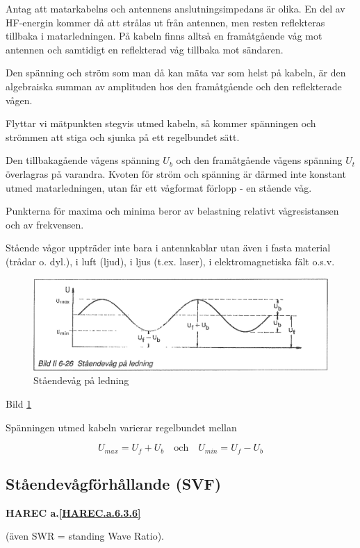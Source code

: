 Antag att matarkabelns och antennens anslutningsimpedans är olika. En
del av HF-energin kommer då att strålas ut från antennen, men resten
reflekteras tillbaka i matarledningen. På kabeln finns alltså en
framåtgående våg mot antennen och samtidigt en reflekterad våg
tillbaka mot sändaren.

Den spänning och ström som man då kan mäta var som helst på kabeln, är
den algebraiska summan av amplituden hos den framåtgående och den
reflekterade vågen.

Flyttar vi mätpunkten stegvis utmed kabeln, så kommer spänningen och
strömmen att stiga och sjunka på ett regelbundet sätt.

Den tillbakagående vågens spänning \(U_b\) och den framåtgående vågens
spänning \(U_t\) överlagras på varandra. Kvoten för ström och spänning
är därmed inte konstant utmed matarledningen, utan får ett vågformat
förlopp - en stående våg.

Punkterna för maxima och minima beror av belastning relativt
vågresistansen och av frekvensen.

Stående vågor uppträder inte bara i antennkablar utan även i fasta
material (trådar o. dyl.), i luft (ljud), i ljus (t.ex. laser), i
elektromagnetiska fält o.s.v.

\begin{figure}
  \includegraphics[width=\textwidth]{images/bild_2_6-26}
  \caption{Ståendevåg på ledning}
  \label{fig:bildII6-26}
\end{figure}

Bild \ref{fig:bildII6-26}

Spänningen utmed kabeln varierar regelbundet mellan

\[U_{max} = U_f + U_b \quad \text{och} \quad U_{min} = U_f - U_b\]

\subsection{Ståendevågförhållande (SVF)}
\textbf{
HAREC a.\ref{HAREC.a.6.3.6}\label{myHAREC.a.6.3.6}
}

(även SWR = standing Wave Ratio).

